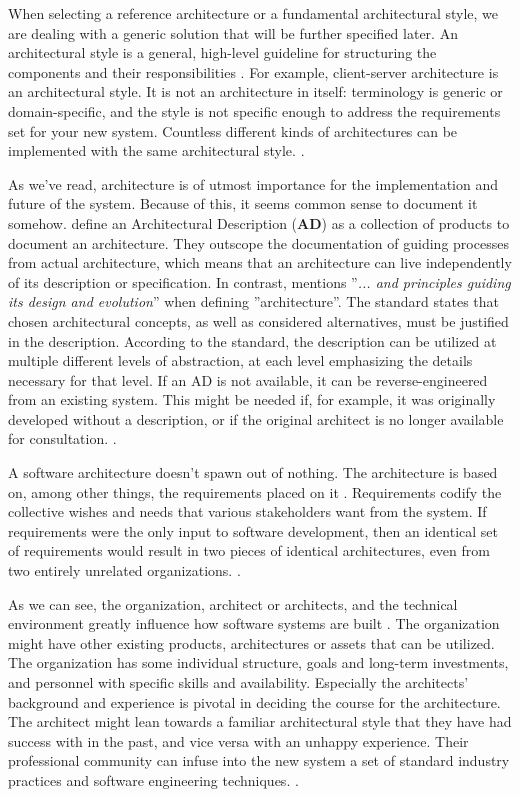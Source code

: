 \documentclass[utf8,english]{gradu3}
\begin{document}
When selecting a reference architecture or a fundamental architectural style, we
are dealing with a generic solution that will be further specified later. An
architectural style is a general, high-level guideline for structuring
the components and their responsibilities \parencite[24]{Bass1998}. For example,
client-server architecture is an architectural style. It is not an architecture
in itself: terminology is generic or domain-specific, and the style is not
specific enough to address the requirements set for your new system. Countless
different kinds of architectures can be implemented with the same architectural
style. \parencite[24]{Bass1998}.

As we've read, architecture is of utmost importance for the implementation and
future of the system. Because of this, it seems common sense to document it
somehow. \textcite[24]{Bass1998} define an Architectural Description
  (\textbf{AD}) as a collection of products to document an architecture.
They outscope the documentation of
guiding processes from actual architecture, which means that an architecture
can live independently of its description or specification. In contrast,
\textcite[3]{IEEE42010} mentions ''\textit{... and principles guiding its design and
evolution}'' when defining ''architecture''. The standard states that chosen architectural concepts, as well as
considered alternatives, must be justified in the description. According to
the standard, the description can be utilized at multiple different
levels of abstraction, at each level emphasizing the details necessary for that
level. If an AD is not available, it can be reverse-engineered from an existing
system. This might be needed if, for example, it was originally developed
without a description, or if the original architect is no longer available for
consultation. \parencite[7, 67]{IEEE42010}.

A software architecture doesn't spawn out of nothing. The architecture is based on,
among other things, the requirements placed on it \parencite{Bass1998}.
Requirements codify the collective wishes and needs that various stakeholders
want from the system. If requirements were the only input to software
development, then an identical set of requirements would result in two pieces of
identical architectures, even from two entirely unrelated organizations.
\parencite[5-9]{Bass1998}.

As we can see, the organization, architect or architects, and the technical
environment greatly influence how software systems are built
\parencite{Bass1998}. The organization might have other existing products,
architectures or assets that can be utilized. The organization has some
individual structure, goals and long-term investments, and personnel with
specific skills and availability. Especially the architects' background and
experience is pivotal in deciding the course for the architecture. The architect
might lean towards a familiar architectural style that they have had success with in
the past, and vice versa with an unhappy experience. Their professional
community can infuse into the new system a set of standard industry practices
and software engineering techniques. \parencite[5-9]{Bass1998}.
\end{document}
